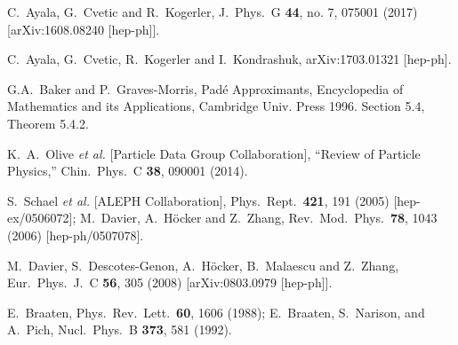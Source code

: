 \documentclass[3p,times,twocolumn]{elsarticle}
\begin{document}
\begin{thebibliography}{999}
  C.~Ayala, G.~Cvetic and R.~Kogerler,
  J.\ Phys.\ G {\bf 44}, no. 7, 075001 (2017)
  [arXiv:1608.08240 [hep-ph]].
 
  C.~Ayala, G.~Cvetic, R.~Kogerler and I.~Kondrashuk,
  arXiv:1703.01321 [hep-ph].
  
G.A.~Baker and P.~Graves-Morris, Pad\'e Approximants, Encyclopedia of Mathematics and its Applications, Cambridge Univ. Press 1996. Section 5.4, Theorem 5.4.2.

  K.~A.~Olive {\it et al.} [Particle Data Group Collaboration],
  ``Review of Particle Physics,''
  Chin.\ Phys.\ C {\bf 38}, 090001 (2014).
  
  S.~Schael {\it et al.}  [ALEPH Collaboration],
Phys.\ Rept.\  {\bf 421}, 191 (2005)
  [hep-ex/0506072];
  M.~Davier, A.~H\"ocker and Z.~Zhang,
 Rev.\ Mod.\ Phys.\  {\bf 78}, 1043 (2006)
  [hep-ph/0507078].
  
  M.~Davier, S.~Descotes-Genon, A.~H\"ocker, B.~Malaescu and Z.~Zhang,
 Eur.\ Phys.\ J.\ C {\bf 56}, 305 (2008)
  [arXiv:0803.0979 [hep-ph]].
  
  E.~Braaten,
 Phys.\ Rev.\ Lett.\  {\bf 60}, 1606 (1988);
E.~Braaten, S.~Narison, and A.~Pich,
 Nucl.\ Phys.\ B {\bf 373}, 581 (1992).


\end{thebibliography}
\end{document}

